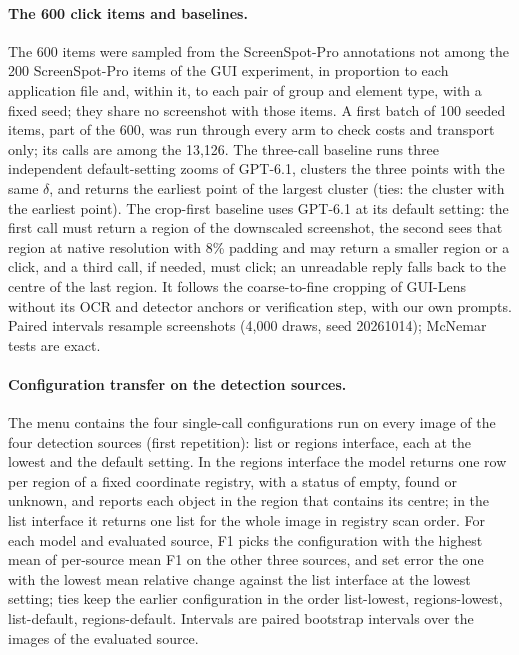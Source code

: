 \paragraph{The 600 click items and baselines.} The 600 items were sampled from the ScreenSpot-Pro annotations not among the 200 ScreenSpot-Pro items of the GUI experiment, in proportion to each application file and, within it, to each pair of group and element type, with a fixed seed; they share no screenshot with those items. A first batch of 100 seeded items, part of the 600, was run through every arm to check costs and transport only; its calls are among the 13,126. The three-call baseline runs three independent default-setting zooms of GPT-6.1, clusters the three points with the same $\delta$, and returns the earliest point of the largest cluster (ties: the cluster with the earliest point). The crop-first baseline uses GPT-6.1 at its default setting: the first call must return a region of the downscaled screenshot, the second sees that region at native resolution with 8\% padding and may return a smaller region or a click, and a third call, if needed, must click; an unreadable reply falls back to the centre of the last region. It follows the coarse-to-fine cropping of GUI-Lens \citep{fu2026guilens} without its OCR and detector anchors or verification step, with our own prompts. Paired intervals resample screenshots (4,000 draws, seed 20261014); McNemar tests are exact.

\paragraph{Configuration transfer on the detection sources.} The menu contains the four single-call configurations run on every image of the four detection sources (first repetition): list or regions interface, each at the lowest and the default setting. In the regions interface the model returns one row per region of a fixed coordinate registry, with a status of empty, found or unknown, and reports each object in the region that contains its centre; in the list interface it returns one list for the whole image in registry scan order. For each model and evaluated source, F1 picks the configuration with the highest mean of per-source mean F1 on the other three sources, and set error the one with the lowest mean relative change against the list interface at the lowest setting; ties keep the earlier configuration in the order list-lowest, regions-lowest, list-default, regions-default. Intervals are paired bootstrap intervals over the images of the evaluated source.

